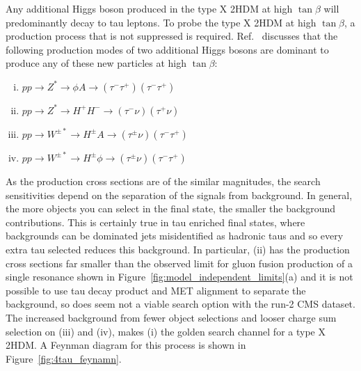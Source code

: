 Any additional Higgs boson produced in the type X 2HDM at high $\tan\beta$ will predominantly decay to tau leptons.
To probe the type X 2HDM at high $\tan\beta$, a production process that is not suppressed is required.
Ref.~\cite{Jueid:2021avn} discusses that the following production modes of two additional Higgs bosons are dominant to produce any of these new particles at high $\tan\beta$:
\begin{enumerate}[i)]
  \item $pp \rightarrow Z^{*} \rightarrow \phi A \rightarrow (\tau^{-}\tau^{+})(\tau^{-}\tau^{+})$
  \item $pp \rightarrow Z^{*} \rightarrow H^{+}H^{-} \rightarrow (\tau^{-}\nu)(\tau^{+}\nu)$
  \item $pp \rightarrow W^{\pm *} \rightarrow H^{\pm}A \rightarrow (\tau^{\pm}\nu)(\tau^{-}\tau^{+})$
  \item $pp \rightarrow W^{\pm *} \rightarrow H^{\pm}\phi \rightarrow (\tau^{\pm}\nu)(\tau^{-}\tau^{+})$
\end{enumerate}
As the production cross sections are of the similar magnitudes, the search sensitivities depend on the separation of the signals from background.
In general, the more objects you can select in the final state, the smaller the background contributions.
This is certainly true in tau enriched final states, where backgrounds can be dominated jets misidentified as hadronic taus and so every extra tau selected reduces this background.
In particular, (ii) has the production cross sections \cite{} far smaller than the observed limit for gluon fusion production of a single resonance shown in Figure~\ref{fig:model_independent_limits}(a) and it is not possible to use tau decay product and MET alignment to separate the background, so does seem not a viable search option with the run-2 CMS dataset.
The increased background from fewer object selections and looser charge sum selection on (iii) and (iv), makes (i) the golden search channel for a type X 2HDM. 
A Feynman diagram for this process is shown in Figure~\ref{fig:4tau_feynamn}. \\

